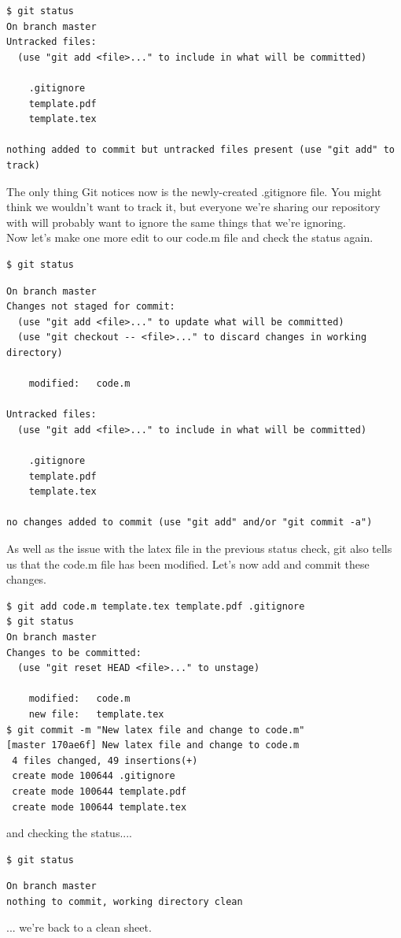 \documentclass{article}
\begin{document}
\begin{lstlisting}
$ git status
On branch master
Untracked files:
  (use "git add <file>..." to include in what will be committed)

	.gitignore
	template.pdf
	template.tex

nothing added to commit but untracked files present (use "git add" to track)
\end{lstlisting}
The only thing Git notices now is the newly-created .gitignore file. You might think we wouldn't want to track it, but everyone we're sharing our repository with will probably want to ignore the same things that we're ignoring.\\


Now let's make one more edit to our code.m file and check the status again.
\begin{lstlisting}
$ git status
\end{lstlisting}
\begin{lstlisting}
On branch master
Changes not staged for commit:
  (use "git add <file>..." to update what will be committed)
  (use "git checkout -- <file>..." to discard changes in working directory)

	modified:   code.m

Untracked files:
  (use "git add <file>..." to include in what will be committed)

	.gitignore
	template.pdf
	template.tex

no changes added to commit (use "git add" and/or "git commit -a")
\end{lstlisting}
As well as the issue with the latex file in the previous status check, git also tells us that the code.m file has been modified. Let's now add and commit these changes.
\begin{lstlisting}[frame=single]
$ git add code.m template.tex template.pdf .gitignore
$ git status
On branch master
Changes to be committed:
  (use "git reset HEAD <file>..." to unstage)

	modified:   code.m
	new file:   template.tex
$ git commit -m "New latex file and change to code.m"
[master 170ae6f] New latex file and change to code.m
 4 files changed, 49 insertions(+)
 create mode 100644 .gitignore
 create mode 100644 template.pdf
 create mode 100644 template.tex
\end{lstlisting}
and checking the status....
\begin{lstlisting}[frame=single]
$ git status
\end{lstlisting}
\begin{lstlisting}[frame=single]
On branch master
nothing to commit, working directory clean
\end{lstlisting}
... we're back to a clean sheet.\\
\end{document}
